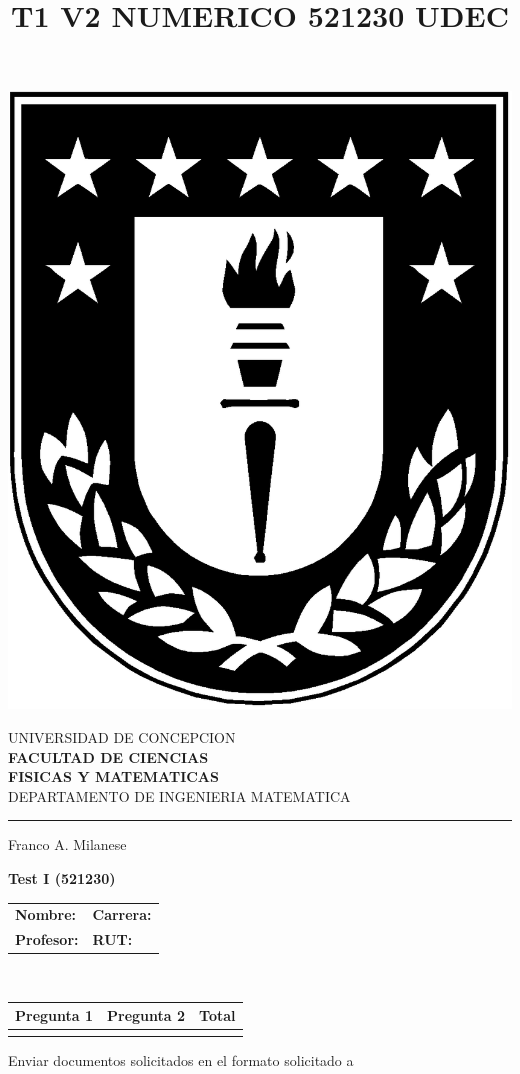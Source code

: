 \documentclass[11pt]{article}
\begin{document}
\title{T1 V2 NUMERICO 521230 UDEC}

\begin{minipage}{0.12\textwidth}
\includegraphics[width=\textwidth]{logoudec.eps}
\end{minipage}
\hspace{5mm}
\begin{minipage}{0.9\textwidth}
UNIVERSIDAD DE CONCEPCION\\
{\small\small\bf 
FACULTAD DE CIENCIAS\\ 
FISICAS Y MATEMATICAS}\\
DEPARTAMENTO DE INGENIERIA MATEMATICA\\
\rule{0.66\textwidth}{.5pt} Franco A. Milanese
\end{minipage}

\vspace{0.5cm}
\centerline{\bf Test I (521230)}
\begin{center}
 \begin{tabular}{p{}p{}}
	\textbf{Nombre:}   &\textbf{Carrera:}\\
	\textbf{Profesor:} & \textbf{ RUT:}
 \end{tabular}
 \\
 \vspace{0.2cm}
 \begin{tabular}{||p{2cm}|p{2cm}||p{2cm}||}
 \hline
 Pregunta 1 &  Pregunta 2 &     Total\\
 \hline

  \vspace{1.5cm} & &       \\
 \hline
 \end{tabular}
 \end{center}
 Enviar documentos solicitados en el formato solicitado a 
\end{document}
